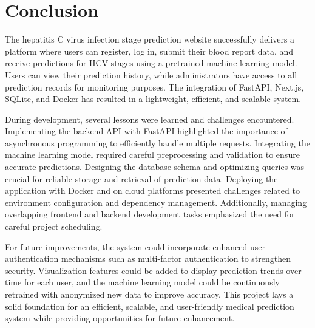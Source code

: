 \section{Conclusion}
The hepatitis C virus infection stage prediction website successfully delivers a platform where users can register,
log in, submit their blood report data, and receive predictions for HCV stages
using a pretrained machine learning model. Users can view their prediction
history, while administrators have access to all prediction records
for monitoring purposes. The integration of FastAPI, Next.js, SQLite,
and Docker has resulted in a lightweight, efficient, and scalable system.

During development, several lessons were learned and challenges encountered.
Implementing the backend API with FastAPI highlighted the importance of asynchronous programming
to efficiently handle multiple requests. Integrating the machine learning model
required careful preprocessing and validation to ensure accurate predictions.
Designing the database schema and optimizing queries was crucial for reliable 
storage and retrieval of prediction data. Deploying the application with Docker
and on cloud platforms presented challenges related to environment configuration and dependency management.
Additionally, managing overlapping frontend and backend development tasks emphasized the need for careful project scheduling.

For future improvements, the system could incorporate enhanced user authentication 
mechanisms such as multi-factor authentication
to strengthen security. Visualization features could be added
to display prediction trends over time for each user, and
the machine learning model could be continuously retrained with anonymized
new data to improve accuracy.
This project lays a solid foundation for an efficient, scalable, and user-friendly
medical prediction system while providing opportunities for future enhancement.
